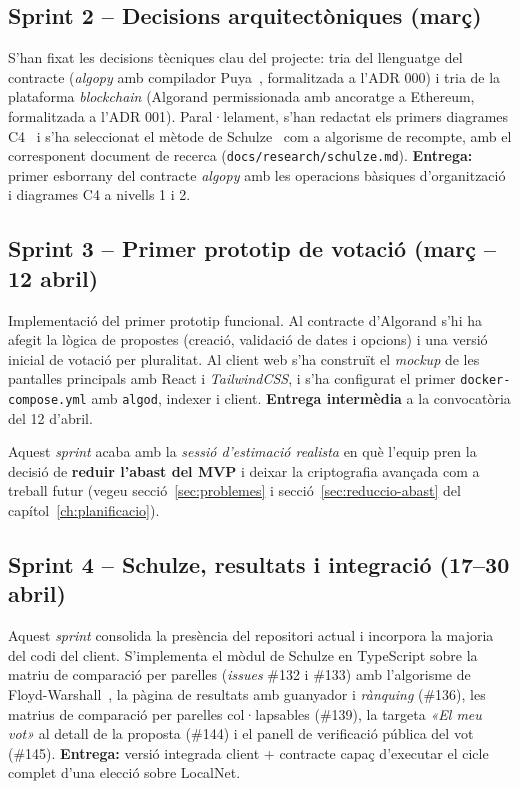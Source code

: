 \subsection{Sprint 2 -- Decisions arquitectòniques (març)}
\label{subsec:sprint-2----decisions-arquitectoniques-(marc)}

S'han fixat les decisions tècniques clau del projecte: tria del llenguatge del contracte (\emph{algopy} amb compilador
Puya~\cite{algorandfoundation2024puya}, formalitzada a l'\ac{ADR} 000) i tria de la plataforma \emph{blockchain}
(Algorand permissionada amb ancoratge a Ethereum, formalitzada a l'\ac{ADR} 001).
Paral·lelament, s'han redactat els primers diagrames C4~\cite{brown2018c4} i s'ha seleccionat el mètode de
Schulze~\cite{schulze2011newmethod} com a algorisme de recompte, amb el corresponent document de recerca
(\texttt{docs/research/schulze.md}).
\textbf{Entrega:} primer esborrany del contracte \emph{algopy} amb les operacions bàsiques d'organització i diagrames C4
a nivells 1 i 2.

\subsection{Sprint 3 -- Primer prototip de votació (març -- 12 abril)}
\label{subsec:sprint-3----primer-prototip-de-votacio-(marc----12-abril)}

Implementació del primer prototip funcional.
Al contracte d'Algorand s'hi ha afegit la lògica de propostes (creació, validació de dates i opcions) i una versió
inicial de votació per pluralitat.
Al client web s'ha construït el \emph{mockup} de les pantalles principals amb React i \emph{TailwindCSS}, i s'ha
configurat el primer \texttt{docker-compose.yml} amb \texttt{algod}, indexer i client.
\textbf{Entrega intermèdia} a la convocatòria del 12 d'abril.

Aquest \emph{sprint} acaba amb la \emph{sessió d'estimació realista} en què l'equip pren la decisió de \textbf{reduir
l'abast del \ac{MVP}} i deixar la criptografia avançada com a treball futur (vegeu secció~\ref{sec:problemes} i
secció~\ref{sec:reduccio-abast} del capítol~\ref{ch:planificacio}).

\subsection{Sprint 4 -- Schulze, resultats i integració (17--30 abril)}
\label{subsec:sprint-4----schulze-resultats-i-integracio-(17--30-abril)}

Aquest \emph{sprint} consolida la presència del repositori actual i incorpora la majoria del codi del client.
S'implementa el mòdul de Schulze en TypeScript sobre la matriu de comparació per parelles (\emph{issues} \#132 i \#133)
amb l'algorisme de Floyd-Warshall~\cite{floyd1962algorithm}, la pàgina de resultats amb guanyador i \emph{rànquing}
(\#136), les matrius de comparació per parelles col·lapsables (\#139), la targeta \emph{«El meu vot»} al detall de la
proposta (\#144) i el panell de verificació pública del vot (\#145).
\textbf{Entrega:} versió integrada client + contracte capaç d'executar el cicle complet d'una elecció sobre LocalNet.

